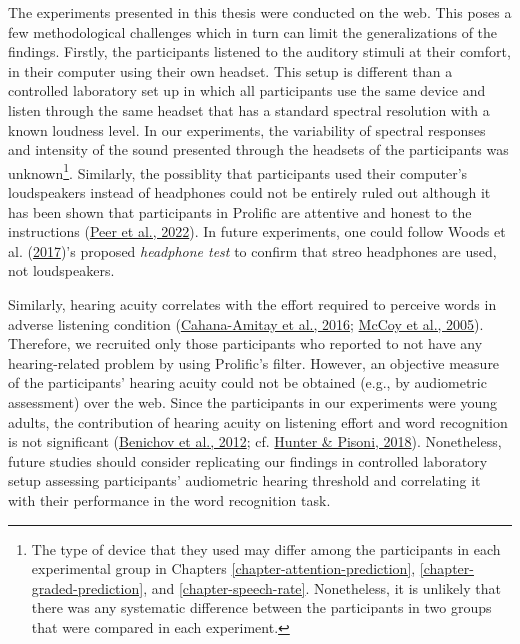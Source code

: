 \documentclass[a4paper, nobind]{templates/ociamthesis}
\begin{document}
The experiments presented in this thesis were conducted on the web.
This poses a few methodological challenges which in turn can limit the generalizations of the findings.
Firstly, the participants listened to the auditory stimuli at their comfort, in their computer using their own headset.
This setup is different than a controlled laboratory set up in which all participants use the same device and listen through the same headset that has a standard spectral resolution with a known loudness level.
In our experiments, the variability of spectral responses and intensity of the sound presented through the headsets of the participants was unknown\footnote{The type of device that they used may differ among the participants in each experimental group in Chapters \ref{chapter-attention-prediction}, \ref{chapter-graded-prediction}, and \ref{chapter-speech-rate}.
  Nonetheless, it is unlikely that there was any systematic difference between the participants in two groups that were compared in each experiment.}.
Similarly, the possiblity that participants used their computer's loudspeakers instead of headphones could not be entirely ruled out although it has been shown that participants in Prolific are attentive and honest to the instructions (\protect\hyperlink{ref-Eyal2022}{Peer et al., 2022}).
In future experiments, one could follow Woods et al. (\protect\hyperlink{ref-Woods2017}{2017})'s proposed \emph{headphone test} to confirm that streo headphones are used, not loudspeakers.

Similarly, hearing acuity correlates with the effort required to perceive words in adverse listening condition (\protect\hyperlink{ref-Cahana2016}{Cahana-Amitay et al., 2016}; \protect\hyperlink{ref-McCoy2005}{McCoy et al., 2005}).
Therefore, we recruited only those participants who reported to not have any hearing-related problem by using Prolific's filter.
However, an objective measure of the participants' hearing acuity could not be obtained (e.g., by audiometric assessment) over the web.
Since the participants in our experiments were young adults, the contribution of hearing acuity on listening effort and word recognition is not significant (\protect\hyperlink{ref-Benichov2012}{Benichov et al., 2012}; cf. \protect\hyperlink{ref-Hunter2018}{Hunter \& Pisoni, 2018}).
Nonetheless, future studies should consider replicating our findings in controlled laboratory setup assessing participants' audiometric hearing threshold and correlating it with their performance in the word recognition task.
\end{document}
